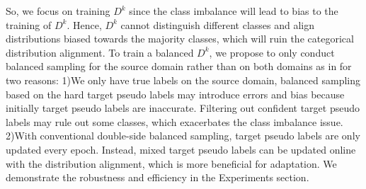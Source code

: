 \documentclass[letterpaper]{article} \usepackage{aaai23}  \usepackage{times}  \usepackage{helvet}  \usepackage{courier}  \usepackage[hyphens]{url}  \usepackage{graphicx} \urlstyle{rm} \def\UrlFont{\rm}  \usepackage{natbib}  \usepackage{caption} \frenchspacing  \setlength{\pdfpagewidth}{8.5in}  \setlength{\pdfpageheight}{11in}
\begin{document}
So, we focus on training $D^k$ since the class imbalance will lead to bias to the training of $D^k$. Hence, $D^k$ cannot distinguish different classes and align distributions biased towards the majority classes, which will ruin the categorical distribution alignment. To train a balanced $D^k$, we propose to only conduct balanced sampling for the source domain rather than on both domains as in \cite{jiang2020implicit} for two reasons: 1)We only have true labels on the source domain, balanced sampling based on the hard target pseudo labels may introduce errors and bias because initially target pseudo labels are inaccurate. Filtering out confident target pseudo labels may rule out some classes, which exacerbates the class imbalance issue. 2)With conventional double-side balanced sampling, target pseudo labels are only updated every epoch. Instead, mixed target pseudo labels can be updated online with the distribution alignment, which is more beneficial for adaptation. We demonstrate the robustness and efficiency in the Experiments section.
\end{document}
